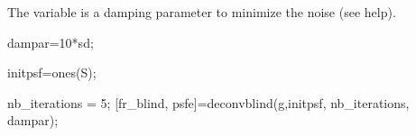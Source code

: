 The  variable is a damping parameter to minimize the noise (see \matlabregistered{} help).

\begin{matlab}
dampar=10*sd;

initpsf=ones(S);

nb_iterations = 5;
[fr_blind, psfe]=deconvblind(g,initpsf, nb_iterations, dampar);
\end{matlab}

\begin{figure}[htbp]
\centering
{}

\hspace{1cm}


\end{figure}
